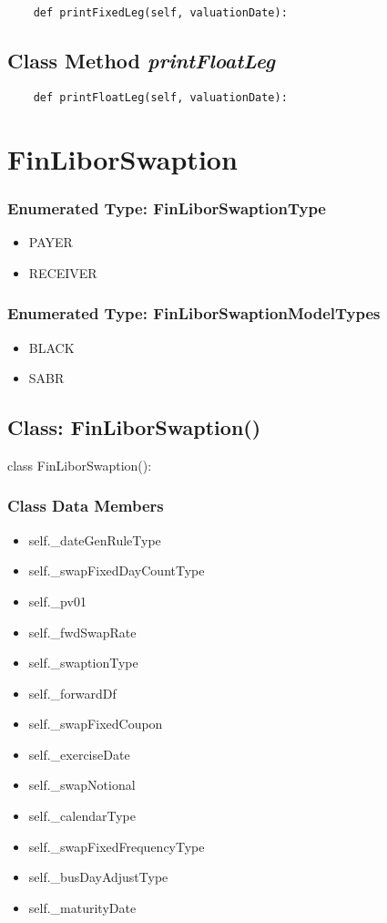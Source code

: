 \documentclass[twoside,11pt]{book}
\begin{document}
\begin{lstlisting}
    def printFixedLeg(self, valuationDate):
\end{lstlisting}

\subsection{Class Method {\it printFloatLeg}}


\begin{lstlisting}
    def printFloatLeg(self, valuationDate):
\end{lstlisting}

\newpage
\section{FinLiborSwaption}

\subsubsection{Enumerated Type: FinLiborSwaptionType}
\begin{itemize}
\item{PAYER}
\item{RECEIVER}
\end{itemize}

\subsubsection{Enumerated Type: FinLiborSwaptionModelTypes}
\begin{itemize}
\item{BLACK}
\item{SABR}
\end{itemize}

\subsection{Class: FinLiborSwaption()}
class FinLiborSwaption():

\subsubsection{Class Data Members}
\begin{itemize}
\item{self.\_dateGenRuleType}
\item{self.\_swapFixedDayCountType}
\item{self.\_pv01}
\item{self.\_fwdSwapRate}
\item{self.\_swaptionType}
\item{self.\_forwardDf}
\item{self.\_swapFixedCoupon}
\item{self.\_exerciseDate}
\item{self.\_swapNotional}
\item{self.\_calendarType}
\item{self.\_swapFixedFrequencyType}
\item{self.\_busDayAdjustType}
\item{self.\_maturityDate}
\end{itemize}
\end{document}
